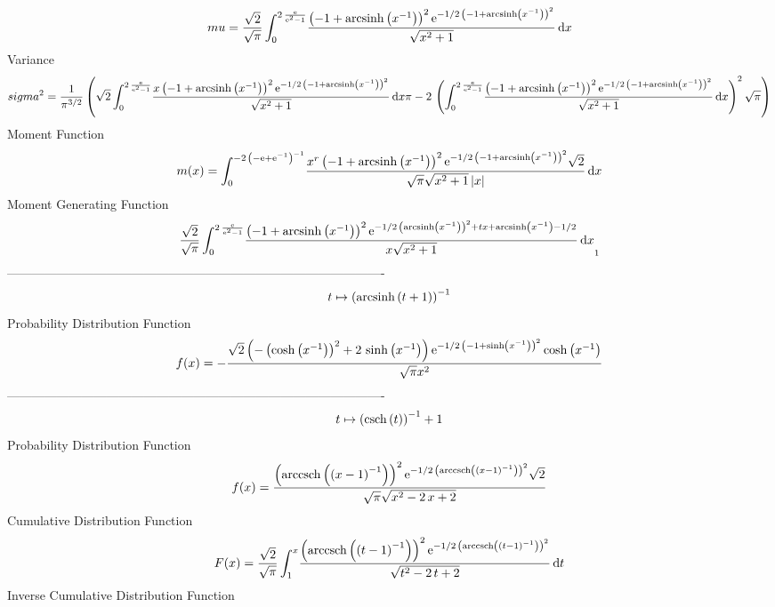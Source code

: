\documentclass[12pt]{article}
\begin{document}
 $$ mu={\frac {\sqrt {2}}{\sqrt {\pi}}\int_{0}^{2\,{\frac {{\rm e}}{{{\rm e}^
{2}}-1}}}\!{\frac { \left( -1+{\rm arcsinh} \left({x}^{-1}\right)
 \right) ^{2}{{\rm e}^{-1/2\, \left( -1+{\rm arcsinh} \left({x}^{-1}
\right) \right) ^{2}}}}{\sqrt {{x}^{2}+1}}}\,{\rm d}x}
$$ Variance 
 $$ sigma^2 = {\frac {1}{{\pi}^{3/2}} \left( \sqrt {2}\int_{0}^{2\,{\frac {{\rm e}}{
{{\rm e}^{2}}-1}}}\!{\frac {x \left( -1+{\rm arcsinh} \left({x}^{-1}
\right) \right) ^{2}{{\rm e}^{-1/2\, \left( -1+{\rm arcsinh} \left({x}
^{-1}\right) \right) ^{2}}}}{\sqrt {{x}^{2}+1}}}\,{\rm d}x\pi-2\,
 \left( \int_{0}^{2\,{\frac {{\rm e}}{{{\rm e}^{2}}-1}}}\!{\frac {
 \left( -1+{\rm arcsinh} \left({x}^{-1}\right) \right) ^{2}{{\rm e}^{-
1/2\, \left( -1+{\rm arcsinh} \left({x}^{-1}\right) \right) ^{2}}}}{
\sqrt {{x}^{2}+1}}}\,{\rm d}x \right) ^{2}\sqrt {\pi} \right) }
$$Moment Function 
 $$ m(x) = \int_{0}^{-2\, \left( -{\rm e}+{{\rm e}^{-1}} \right) ^{-1}}\!{\frac {
{x}^{r} \left( -1+{\rm arcsinh} \left({x}^{-1}\right) \right) ^{2}{
{\rm e}^{-1/2\, \left( -1+{\rm arcsinh} \left({x}^{-1}\right) \right) 
^{2}}}\sqrt {2}}{\sqrt {\pi}\sqrt {{x}^{2}+1} \left| x \right| }}
\,{\rm d}x
$$ Moment Generating Function 
 $${\frac {\sqrt {2}}{\sqrt {\pi}}\int_{0}^{2\,{\frac {{\rm e}}{{{\rm e}^
{2}}-1}}}\!{\frac { \left( -1+{\rm arcsinh} \left({x}^{-1}\right)
 \right) ^{2}{{\rm e}^{-1/2\, \left( {\rm arcsinh} \left({x}^{-1}
\right) \right) ^{2}+tx+{\rm arcsinh} \left({x}^{-1}\right)-1/2}}}{x
\sqrt {{x}^{2}+1}}}\,{\rm d}x}_{{1}}
$$-------------------------------------------------------------------------------------------  \\$$t\mapsto  \left( {\rm arcsinh} \left(t+1\right) \right) ^{-1}
$$Probability Distribution Function 
$$  f(x)=-{\frac {\sqrt {2} \left( - \left( \cosh \left( {x}^{-1} \right) 
 \right) ^{2}+2\,\sinh \left( {x}^{-1} \right)  \right) {{\rm e}^{-1/2
\, \left( -1+\sinh \left( {x}^{-1} \right)  \right) ^{2}}}\cosh
 \left( {x}^{-1} \right) }{\sqrt {\pi}{x}^{2}}}
$$-------------------------------------------------------------------------------------------  \\$$t\mapsto  \left( {\rm csch} \left(t\right) \right) ^{-1}+1
$$Probability Distribution Function 
$$  f(x)={\frac { \left( {\rm arccsch} \left( \left( x-1 \right) ^{-1}\right)
 \right) ^{2}{{\rm e}^{-1/2\, \left( {\rm arccsch} \left( \left( x-1
 \right) ^{-1}\right) \right) ^{2}}}\sqrt {2}}{\sqrt {\pi}\sqrt {{x}^{
2}-2\,x+2}}}
$$Cumulative Distribution Function  
 $$F(x)={\frac {\sqrt {2}}{\sqrt {\pi}}\int_{1}^{x}\!{\frac { \left( 
{\rm arccsch} \left( \left( t-1 \right) ^{-1}\right) \right) ^{2}{
{\rm e}^{-1/2\, \left( {\rm arccsch} \left( \left( t-1 \right) ^{-1}
\right) \right) ^{2}}}}{\sqrt {{t}^{2}-2\,t+2}}}\,{\rm d}t}
$$ Inverse Cumulative Distribution Function 
\end{document}
